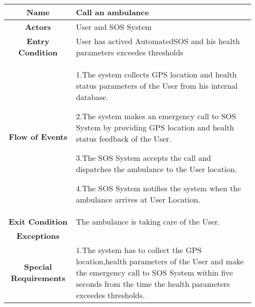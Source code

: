     \subsubsection{}

      \begin{table}[h!]
        \centering
        \begin{tabularx}{\linewidth}{|c|X|}
          \hline
          \textbf{Name} & Call an ambulance\\
        	\hline
        	\textbf{Actors} & User and SOS System\\
        	\hline
        	\textbf{Entry Condition} & User has actived AutomatedSOS and his health parameters exceedes thresholds\\
        	\hline
        	\textbf{Flow of Events} & 1.The system collects GPS location and health status parameters of the User from his internal 						database.

        					2.The system makes an emergency call to SOS System by providing GPS location and health 							status feedback of the User.

        					3.The SOS System accepts the call and dispatches the ambulance to the User location.

        					4.The SOS System notifies the system when the ambulance arrives at User Location.\\
        	\hline
        	\textbf{Exit Condition} & The ambulance is taking care of the User. \\
        	\hline
        	\textbf{Exceptions} & \\
        	\hline
        	\textbf{Special Requirements} & 1.The system has to collect the GPS location,health parameters of the User and make the 							emergency call to SOS System within five seconds from the time the health parameters 							exceedes thresholds.\\
          \hline
        \end{tabularx}
      \end{table}

    \subsubsection{}

